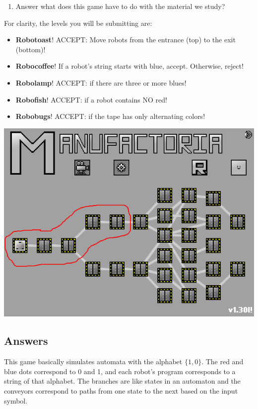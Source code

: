 \documentclass[10pt, legalpaper]{exam}
\begin{document}
\begin{questions}
\begin{enumerate}
\item Answer what does this game have to do with the material we study?\end{enumerate}
For clarity, the levels you will be submitting are:
\begin{itemize}
\item \textbf{Robotoast}! ACCEPT: Move robots from the entrance (top) to the exit (bottom)!
\item \textbf{Robocoffee}! If a robot's string starts with blue, accept. Otherwise, reject!
\item \textbf{Robolamp}! ACCEPT: if there are three or more blues!
\item \textbf{Robofish}! ACCEPT: if a robot contains NO red!
\item \textbf{Robobugs}! ACCEPT: if the tape has only alternating colors!
\end{itemize}
\includegraphics[scale=0.7]{manufactoria.png}

\subsection*{Answers}
This game basically simulates automata with the alphabet \(\{1,0\}\). The red and blue dots correspond to 0 and 1, and each robot's program corresponds to a string of that alphabet. The branches are like states in an automaton and the conveyors correspond to paths from one state to the next based on the input symbol.

\end{questions}
\end{document}
